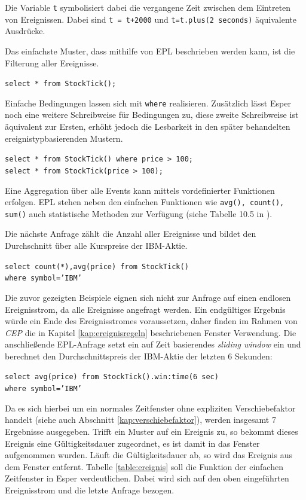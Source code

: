 \documentclass{acm_proc_article-sp}
\begin{document}
Die Variable \texttt{t} symbolisiert dabei die vergangene Zeit zwischen dem Eintreten von 
Ereignissen. Dabei sind \texttt{t = t+2000} und \texttt{t=t.plus(2 seconds)} äquivalente 
Ausdrücke. 

Das einfachste Muster, dass mithilfe von EPL beschrieben werden kann, ist die Filterung 
aller Ereignisse.

\texttt{select * from StockTick();}

Einfache Bedingungen lassen sich mit \texttt{where} realisieren. Zusätzlich lässt Esper 
noch eine weitere Schreibweise für Bedingungen zu, diese zweite Schreibweise ist 
äquivalent zur Ersten, erhöht jedoch die Lesbarkeit in den später behandelten 
ereignistypbasierenden Mustern.

\texttt{select * from StockTick() where price > 100;}\\
\texttt{select * from StockTick(price > 100);}

Eine Aggregation über alle Events kann mittels vordefinierter Funktionen erfolgen. EPL 
stehen neben den einfachen Funktionen wie \texttt{avg(), count(), sum()} auch 
statistische Methoden zur Verfügung (siehe Tabelle 10.5 in \cite{esper-reference}).

Die nächste Anfrage zählt die Anzahl aller Ereignisse und bildet den Durchschnitt über 
alle Kurspreise der IBM-Aktie.

\texttt{select  count(*),avg(price) from StockTick()\\where symbol='IBM'}

Die zuvor gezeigten Beispiele eignen sich nicht zur Anfrage auf einen endlosen 
Ereignisstrom, da alle Ereignisse angefragt werden. Ein endgültiges Ergebnis würde ein 
Ende des Ereignisstromes voraussetzen, daher finden im Rahmen von \textit{CEP} die in 
Kapitel \ref{kap:ereignisregeln} beschriebenen Fenster Verwendung. Die anschließende 
EPL-Anfrage setzt ein auf Zeit basierendes \textit{sliding window} ein und berechnet den 
Durchschnittspreis der IBM-Aktie der letzten 6 Sekunden:

\texttt{select  avg(price) from StockTick().win:time(6 sec)\\where symbol='IBM'}

Da es sich hierbei um ein normales Zeitfenster ohne expliziten Verschiebefaktor handelt 
(siehe auch Abschnitt \ref{kap:verschiebefaktor}), werden insgesamt 7 Ergebnisse 
ausgegeben. Trifft ein Muster auf ein Ereignis zu, so bekommt dieses Ereignis eine 
Gültigkeitsdauer zugeordnet, es ist damit in das Fenster aufgenommen wurden. Läuft die 
Gültigkeitsdauer ab, so wird das Ereignis aus dem Fenster entfernt. Tabelle 
\ref{table:ereignis} soll die Funktion der einfachen Zeitfenster in Esper verdeutlichen. 
Dabei wird sich auf den oben eingeführten Ereignisstrom und die letzte Anfrage bezogen.
\end{document}
